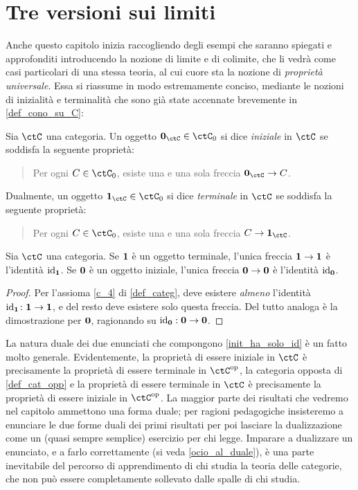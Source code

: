 \section{Tre versioni sui limiti}
Anche questo capitolo inizia raccogliendo degli esempi che saranno spiegati e approfonditi introducendo la nozione di limite e di colimite, che li vedrà come casi particolari di una stessa teoria, al cui cuore sta la nozione di \emph{proprietà universale}. Essa si riassume in modo estremamente conciso, mediante le nozioni di inizialità e terminalità che sono già state accennate brevemente in \ref{def_cono_su_C}:
\begin{definition}\label{def_ogg_init_term}
 Sia \(\ctC\) una categoria. Un oggetto \(\init_\ctC\in\ctC_0\) si dice \emph{iniziale} in \(\ctC\) se soddisfa la seguente proprietà:
 \begin{quote}
  Per ogni \(C\in\ctC_0\), esiste una e una sola freccia \(\init_\ctC \to C\).
 \end{quote}
 Dualmente, un oggetto \(\term_\ctC\in\ctC_0\) si dice \emph{terminale} in \(\ctC\) se soddisfa la seguente proprietà:
 \begin{quote}
  Per ogni \(C\in\ctC_0\), esiste una e una sola freccia \(C\to\term_\ctC\).
 \end{quote}
\end{definition}
\begin{lemma}\label{init_ha_solo_id}
 Sia \(\ctC\) una categoria. Se \(\textbf{1}\) è un oggetto terminale, l'unica freccia \(\textbf{1}\to\textbf{1}\) è l'identità \(\mathrm{id}_{\textbf{1}}\). Se \(\textbf{0}\) è un oggetto iniziale, l'unica freccia \(\textbf{0}\to\textbf{0}\) è l'identità \(\mathrm{id}_{\textbf{0}}\).
\end{lemma}
\begin{proof}
 Per l'assioma \ref{c_4} di \ref{def_categ}, deve esistere \emph{almeno} l'identità \(\mathrm{id}_{\textbf{1}} \colon \textbf{1}\to\textbf{1}\), e del resto deve esistere solo questa freccia. Del tutto analoga è la dimostrazione per \(\textbf{0}\), ragionando su $\mathrm{id}_{\textbf{0}} : \textbf{0} \to \textbf{0}$.
\end{proof}
La natura duale dei due enunciati che compongono \ref{init_ha_solo_id} è un fatto molto generale. Evidentemente, la proprietà di essere iniziale in \(\ctC\) è precisamente la proprietà di essere terminale in \(\ctC^\op\), la categoria opposta di \ref{def_cat_opp} e la proprietà di essere terminale in \(\ctC\) è precisamente la proprietà di essere iniziale in \(\ctC^\op\). La maggior parte dei risultati che vedremo nel capitolo ammettono una forma duale; per ragioni pedagogiche insisteremo a enunciare le due forme duali dei primi risultati per poi lasciare la dualizzazione come un (quasi sempre semplice) esercizio per chi legge. Imparare a dualizzare un enunciato, e a farlo correttamente (si veda \ref{ocio_al_duale}), è una parte inevitabile del percorso di apprendimento di chi studia la teoria delle categorie, che non può essere completamente sollevato dalle spalle di chi studia.
